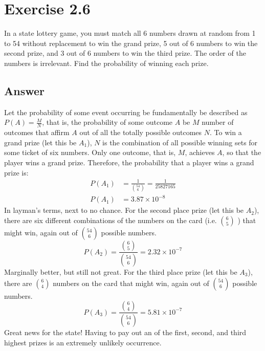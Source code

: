 \documentclass{article}
\begin{document}
\section*{Exercise 2.6}
In a state lottery game, you must match all 6 numbers drawn at random from 1 to 54 without replacement to win the grand prize, 5 out of 6 numbers to win the second prize, and 3 out of 6 numbers to win the third prize. The order of the numbers is irrelevant. Find the probability of winning each prize.

\subsection*{Answer}
Let the probability of some event occurring be fundamentally be described as $P(A) = \frac{M}{N}$, that is, the probability of some outcome $A$ be $M$ number of outcomes that affirm $A$ out of all the totally possible outcomes $N$. To win a grand prize (let this be $A_1$), $N$ is the combination of all possible winning sets for some ticket of six numbers. Only one outcome, that is, $M$, achieves $A$, so that the player wins a grand prize. Therefore, the probability that a player wins a grand prize is:
\begin{align*}
	P(A_1) &= \frac{1}{\binom{54}{6}} = \frac{1}{25827165} \\
	P(A_1) &= 3.87\times 10^{-8}
\end{align*}
In layman's terms, next to no chance. For the second place prize (let this be $A_2$), there are six different combinations of the numbers on the card (i.e. $\binom{6}{5}$ ) that might win, again out of $\binom{54}{6}$ possible numbers.
\[ P(A_2) = \frac{\binom{6}{5}}{\binom{54}{6}} = 2.32 \times 10^{-7} \]
Marginally better, but still not great. For the third place prize (let this be $A_3$), there are $\binom{6}{4}$ numbers on the card that might win, again out of $\binom{54}{6}$ possible numbers.
\[ P(A_3) = \frac{\binom{6}{4}}{\binom{54}{6}} = 5.81 \times 10^{-7} \]
Great news for the state! Having to pay out an of the first, second, and third highest prizes is an extremely unlikely occurrence.
\end{document}
